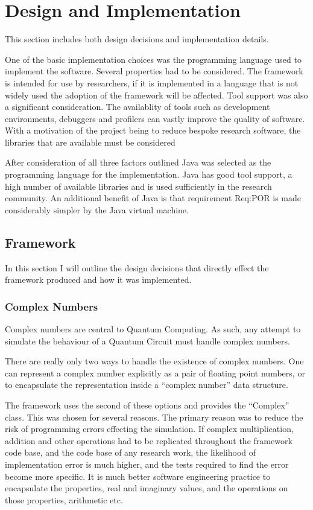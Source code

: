 \chapter{Design and Implementation}
\label{sec:desandimp}
\lstset{language=Java}
This section includes both design decisions and implementation details.

One of the basic implementation choices was the programming language used to implement the software.
Several properties had to be considered.
The framework is intended for use by researchers, if it is implemented in a language that is not widely used the adoption of the framework will be affected.
Tool support was also a significant consideration.
The availablity of tools such as development environments, debuggers and profilers can vastly improve the quality of software.
With a motivation of the project being to reduce bespoke research software, the libraries that are available must be considered

After consideration of all three factors outlined Java was selected as the programming language for the implementation.
Java has good tool support, a high number of available libraries and is used sufficiently in the research community.
An additional benefit of Java is that requirement Req:POR is made considerably simpler by the Java virtual machine.

\section{Framework}
In this section I will outline the design decisions that directly effect the framework produced and how it was implemented.

\subsection{Complex Numbers}
Complex numbers are central to Quantum Computing.
As such, any attempt to simulate the behaviour of a Quantum Circuit must handle complex numbers.

There are really only two ways to handle the existence of complex numbers.
One can represent a complex number explicitly as a pair of floating point numbers, or to encapsulate the representation inside a ``complex number'' data structure.

The framework uses the second of these options and provides the ``Complex'' class.
This was chosen for several reasons.
The primary reason was to reduce the risk of programming errors effecting the simulation.
If complex multiplication, addition and other operations had to be replicated throughout the framework code base, and the code base of any research work, the likelihood of implementation error is much higher, and the tests required to find the error become more specific.
It is much better software engineering practice to encapsulate the properties, real and imaginary values, and the operations on those properties, arithmetic etc.

